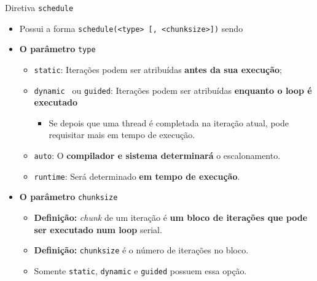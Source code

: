 	\begin{frame}{Diretiva {\tt schedule}}
		\begin{itemize}
			\setlength\itemsep{1em}
			\item Possui a forma {\tt schedule(<type> [, <chunksize>])} sendo
			\item \textbf{O parâmetro }{\tt type}
			\begin{itemize}
				\setlength\itemsep{0.4em}
				\item {\tt static}: Iterações podem ser atribuídas \textbf{antes da sua execução};
				\item {\tt dynamic } ou {\tt guided}: Iterações podem ser atribuídas \textbf{enquanto o loop é executado}
				\begin{itemize}
					\item Se depois que uma thread é completada na iteração atual, pode requisitar mais em tempo de execução.
				\end{itemize}

				\item {\tt auto}: O \textbf{compilador e sistema determinará} o escalonamento.
				\item {\tt runtime}: Será determinado \textbf{em tempo de execução}.
			\end{itemize}

			\item \textbf{O parâmetro} {\tt chunksize}
			\begin{itemize}
				\setlength\itemsep{0.4em}
				\item \textbf{Definição:} \textit{chunk} de um iteração é \textbf{um bloco de iterações que pode ser executado num loop} serial.
				\item \textbf{Definição:} {\tt chunksize} é o número de iterações no bloco.
				\item Somente {\tt static}, {\tt dynamic} e {\tt guided} possuem essa opção.
			\end{itemize}
		\end{itemize}
	\end{frame}

